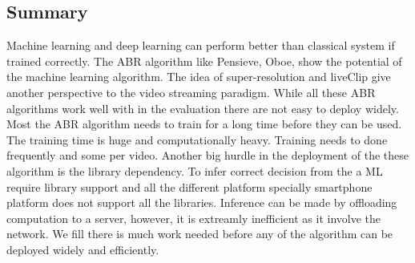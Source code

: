 \subsection{Summary}
Machine learning and deep learning can perform better than classical system if trained correctly. The ABR algorithm like Pensieve, Oboe, show the potential of the machine learning algorithm. The idea of super-resolution and liveClip give another perspective to the video streaming paradigm. While all these ABR algorithms work well with in the evaluation there are not easy to deploy widely. Most the ABR algorithm needs to train for a long time before they can be used. The training time is huge and computationally heavy. Training needs to done frequently and some per video. Another big hurdle in the deployment of the these algorithm is the library dependency. To infer correct decision from the a ML require library support and all the different platform specially smartphone platform does not support all the libraries. Inference can be made by offloading computation to a server, however, it is extreamly inefficient as it involve the network. We fill there is much work needed before any of the algorithm can be deployed widely and efficiently.

